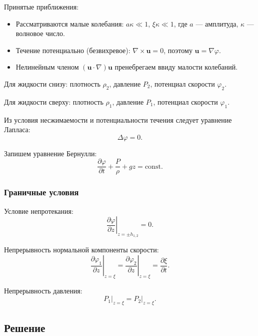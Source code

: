 \documentclass[a4paper,12pt]{article}
\begin{document}
Принятые приближения:
\begin{itemize}
    \item Рассматриваются малые колебания: $a\kappa \ll 1$,
          $\xi\kappa \ll 1$, где $a$ — амплитуда, $\kappa$ — волновое число.
    \item Течение потенциально (безвихревое): $\nabla \times \mathbf{u} = 0$,
          поэтому $\mathbf{u} = \nabla\varphi$.
    \item Нелинейным членом $(\mathbf{u} \cdot \nabla)\mathbf{u}$
          пренебрегаем ввиду малости колебаний.
\end{itemize}

Для жидкости снизу: плотность $\rho_2$, давление $P_2$, потенциал скорости $\varphi_2$.

Для жидкости сверху: плотность $\rho_1$, давление $P_1$, потенциал скорости $\varphi_1$.


Из условия несжимаемости и потенциальности течения следует уравнение Лапласа:
\begin{equation}
    \Delta \varphi = 0.
\end{equation}

Запишем уравнение Бернулли:
\begin{equation}
    \frac{\partial \varphi}{\partial t} + \frac{P}{\rho} + gz = \mathrm{const}.
    \label{eq:bernoulli}
\end{equation}

\subsubsection*{Граничные условия}

Условие непротекания:
\begin{equation}
    \left.\frac{\partial \varphi}{\partial z}\right|_{z=\pm h_{1,2}} = 0.
\end{equation}

Непрерывность нормальной компоненты скорости:
\begin{equation}
    \left.\frac{\partial \varphi_1}{\partial z}\right|_{z=\xi}
    = \left.\frac{\partial \varphi_2}{\partial z}\right|_{z=\xi}
    = \frac{\partial \xi}{\partial t}.
    \label{eq:kinematic}
\end{equation}

Непрерывность давления:
\begin{equation}
    P_1\big|_{z=\xi} = P_2\big|_{z=\xi}.
    \label{eq:dynamic}
\end{equation}

\subsection*{Решение}
\end{document}
